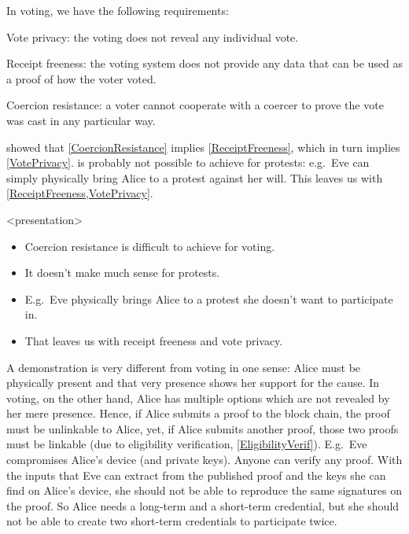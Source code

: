 In voting, we have the following requirements:
\begin{frame}
\begin{requirements}[P]
\item\label{VotePrivacy} Vote privacy: the voting does not reveal any 
  individual vote.
\item\label{ReceiptFreeness} Receipt freeness: the voting system does not 
  provide any data that can be used as a proof of how the voter voted.
\item\label{CoercionResistance} Coercion resistance: a voter cannot cooperate 
  with a coercer to prove the vote was cast in any particular way.
\end{requirements}
\pause
{}
\end{frame}
\Textcite{VerifyingPrivacyPropertiesOfVotingProtocols} showed that 
\cref{CoercionResistance} implies \cref{ReceiptFreeness}, which in turn implies
\cref{VotePrivacy}.
 is probably not possible to achieve for protests:
e.g.\ Eve can simply physically bring Alice to a protest against her will.
This leaves us with \cref{ReceiptFreeness,VotePrivacy}.

\begin{frame}<presentation>
  \begin{remark}
    \begin{itemize}
      \item Coercion resistance is difficult to achieve for voting.
      \item It doesn't make much sense for protests.
      \item E.g.\ Eve physically brings Alice to a protest she doesn't want to 
        participate in.
      \item That leaves us with receipt freeness and vote privacy.
    \end{itemize}
  \end{remark}
\end{frame}

A demonstration is very different from voting in one sense: Alice must be 
physically present and that very presence shows her support for the cause.
In voting, on the other hand, Alice has multiple options which are not revealed
by her mere presence.
Hence, if Alice submits a proof to the block chain, the proof must be 
unlinkable to Alice, yet, if Alice submits another proof, those two proofs must 
be linkable (due to eligibility verification, \cref{EligibilityVerif}).
E.g.\ Eve compromises Alice's device (and private keys).
Anyone can verify any proof.
With the inputs that Eve can extract from the published proof and the keys she 
can find on Alice's device, she should not be able to reproduce the same 
signatures on the proof.
So Alice needs a long-term and a short-term credential, but she should not be 
able to create two short-term credentials to participate twice.

